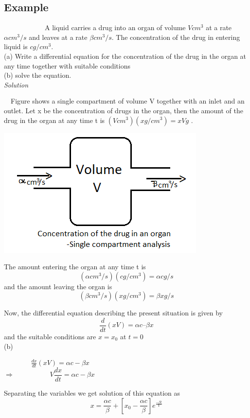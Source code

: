 \subsection*{Example}
~~~~~~~~~~~~A liquid carries a drug into an organ of volume $V cm^{3}$ at a rate $\alpha cm^{3}/s$ and leaves at a rate $\beta cm^{3}/s$. The concentration of the drug in entering liquid  is $c g/cm^{3}$. \\ (a) Write a differential equation for the concentration of the drug in the  organ at any time together with suitable conditions \\
(b) solve the equation. ~\\

\textit{\Large Solution}\\

\par ~~Figure shows a single compartment of volume V together  with an inlet and an outlet. Let x be the concentration of drugs in the organ, then  the amount of the drug in the organ at any time t is      
$(V cm^{3})(x g/cm^{3}) = xV g$ .\\


\begin{center} %
	\scalebox{1.00} %
	{\includegraphics{graph9.png}} %
\end{center}


The amount entering the organ at any time t is
$$(\alpha cm^{3}/s) (c g/cm^{3}) = \alpha c  g/s $$	
and the amount leaving the organ is
$$(\beta cm^{3}/s) (x g/cm^{3}) = \beta x g/s $$

Now, the differential equation describing the present situation is given by 
$$\frac{d}{dt}(xV)= \alpha c– \beta x $$ 
and the suitable conditions are $x=x_{0}$ at $t=0$ \\
\linebreak 
(b) 
\begin{center}
	$~~~~~~~~~~~~~~~~~~\frac{dx}{dt}(xV)=\alpha c-\beta x$ \\
	$\Rightarrow~~~~~~~~~~$ 
	$~~~~~~~~~~~~V\dfrac{dx}{dt}=\alpha c-\beta x~~~~~~$ 
\end{center} 
Separating the variables we get solution of this equation as 
$$x=\frac{\alpha c}{\beta}+[x_{0}-\frac{\alpha c}{\beta}]e^{\frac{-\beta t}{V}}$$

